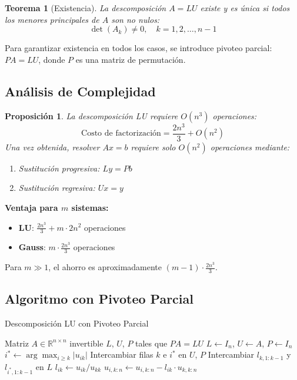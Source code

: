 \documentclass[12pt,a4paper]{article}
\newtheorem{theorem}{Teorema}
\newtheorem{proposition}{Proposición}
\begin{document}
\begin{theorem}[Existencia]
La descomposición \(A = LU\) existe y es única si todos los menores principales de \(A\) son no nulos:
\[
\det(A_k) \neq 0, \quad k = 1, 2, \ldots, n-1
\]
\end{theorem}

Para garantizar existencia en todos los casos, se introduce pivoteo parcial: \(PA = LU\), donde \(P\) es una matriz de permutación.

\subsection{Análisis de Complejidad}

\begin{proposition}
La descomposición LU requiere \(O(n^3)\) operaciones:
\[
\text{Costo de factorización} = \frac{2n^3}{3} + O(n^2)
\]
Una vez obtenida, resolver \(Ax = b\) requiere solo \(O(n^2)\) operaciones mediante:
\begin{enumerate}
\item Sustitución progresiva: \(Ly = Pb\)
\item Sustitución regresiva: \(Ux = y\)
\end{enumerate}
\end{proposition}

\textbf{Ventaja para \(m\) sistemas:}
\begin{itemize}
\item \textbf{LU}: \(\frac{2n^3}{3} + m \cdot 2n^2\) operaciones
\item \textbf{Gauss}: \(m \cdot \frac{2n^3}{3}\) operaciones
\end{itemize}

Para \(m \gg 1\), el ahorro es aproximadamente \((m-1) \cdot \frac{2n^3}{3}\).

\subsection{Algoritmo con Pivoteo Parcial}

\begin{algorithm}[H]
\caption{Descomposición LU con Pivoteo Parcial}
\begin{algorithmic}[1]
\REQUIRE Matriz \(A \in \mathbb{R}^{n \times n}\) invertible
\ENSURE \(L\), \(U\), \(P\) tales que \(PA = LU\)
\STATE \(L \leftarrow I_n\), \(U \leftarrow A\), \(P \leftarrow I_n\)
    \STATE \(i^* \leftarrow \arg\max_{i \geq k} |u_{ik}|\)
        \STATE Intercambiar filas \(k\) e \(i^*\) en \(U\), \(P\)
        \STATE Intercambiar \(l_{k,1:k-1}\) y \(l_{i^*,1:k-1}\) en \(L\)
    \ENDIF
        \STATE \(l_{ik} \leftarrow u_{ik}/u_{kk}\)
        \STATE \(u_{i,k:n} \leftarrow u_{i,k:n} - l_{ik} \cdot u_{k,k:n}\)
    \ENDFOR
\ENDFOR
\end{algorithmic}
\end{algorithm}
\end{document}
